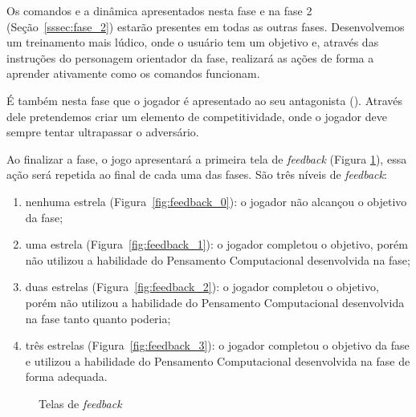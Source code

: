 

Os comandos e a dinâmica apresentados nesta fase e na fase 2 (Seção~\ref{sssec:fase_2}) estarão presentes em todas as outras fases. Desenvolvemos um treinamento mais lúdico, onde o usuário tem um objetivo e, através das instruções do personagem orientador da fase, realizará as ações de forma a aprender ativamente como os comandos funcionam.

É também nesta fase que o jogador é apresentado ao seu antagonista (). Através dele pretendemos criar um elemento de competitividade, onde o jogador deve sempre tentar ultrapassar o adversário.


Ao finalizar a fase, o jogo apresentará a primeira tela de \textit{feedback} (Figura \ref{fig:feedbacks}), essa ação será repetida ao final de cada uma das fases. São três níveis de \textit{feedback}: 

\begin{enumerate}
	\item nenhuma estrela (Figura~\ref{fig:feedback_0}): o jogador não alcançou o objetivo da fase;
	\item uma estrela (Figura~\ref{fig:feedback_1}): o jogador completou o objetivo, porém não utilizou a habilidade do Pensamento Computacional desenvolvida na fase;
	\item duas estrelas (Figura~\ref{fig:feedback_2}): o jogador completou o objetivo, porém não utilizou a habilidade do Pensamento Computacional desenvolvida na fase tanto quanto poderia;
	\item três estrelas (Figura~\ref{fig:feedback_3}): o jogador completou o objetivo da fase e utilizou a habilidade do Pensamento Computacional desenvolvida na fase de forma adequada.
\end{enumerate}

\begin{figure}[H]
\centering
{}
\quad %
\quad %
\quad %
\caption{Telas de \textit{feedback}}
\label{fig:feedbacks}
\end{figure}

